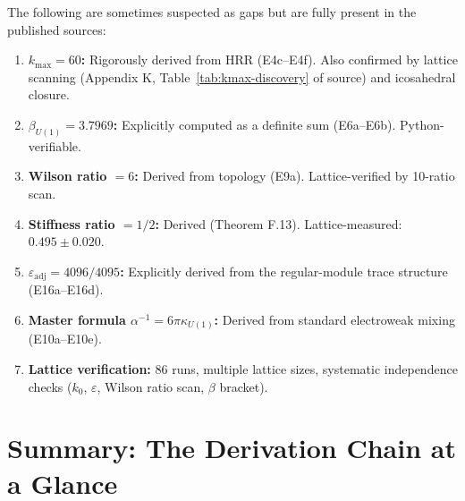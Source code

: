 \documentclass[12pt,a4paper]{article}
\begin{document}
The following are sometimes suspected as gaps but are fully present
in the published sources:

\begin{enumerate}
\item \textbf{$k_{\max} = 60$:} Rigorously derived from HRR
  (E4c--E4f).  Also confirmed by lattice scanning (Appendix K,
  Table~\ref{tab:kmax-discovery} of source) and icosahedral closure.

\item \textbf{$\beta_{U(1)} = 3.7969$:} Explicitly computed as a
  definite sum (E6a--E6b).  Python-verifiable.

\item \textbf{Wilson ratio $= 6$:} Derived from topology (E9a).
  Lattice-verified by 10-ratio scan.

\item \textbf{Stiffness ratio $= 1/2$:} Derived (Theorem F.13).
  Lattice-measured: $0.495 \pm 0.020$.

\item \textbf{$\varepsilon_{\mathrm{adj}} = 4096/4095$:} Explicitly
  derived from the regular-module trace structure (E16a--E16d).

\item \textbf{Master formula $\alpha^{-1} = 6\pi\kappa_{U(1)}$:}
  Derived from standard electroweak mixing (E10a--E10e).

\item \textbf{Lattice verification:} 86 runs, multiple lattice sizes,
  systematic independence checks ($k_0$, $\varepsilon$, Wilson ratio
  scan, $\beta$ bracket).
\end{enumerate}

\section{Summary: The Derivation Chain at a Glance}
\label{sec:summary}
\end{document}
